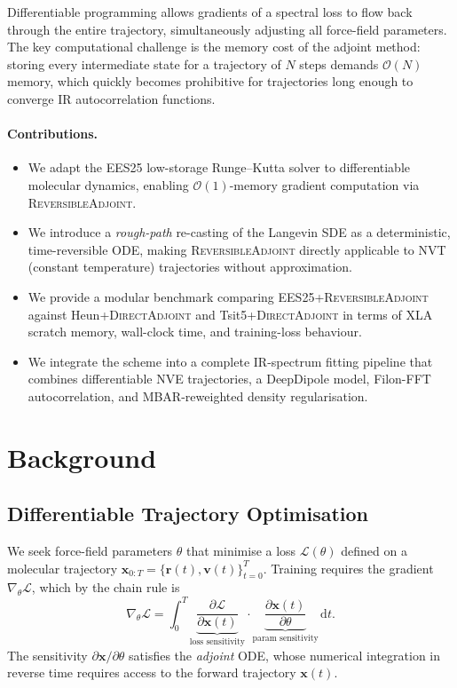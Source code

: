 \documentclass{article}
\newcommand{\dd}{\,\mathrm{d}}
\newcommand{\EES}{\textsc{EES25}}
\newcommand{\RevAdj}{\textsc{ReversibleAdjoint}}
\newcommand{\MBAR}{\textsc{MBAR}}
\begin{document}
Differentiable programming allows gradients of a spectral loss to flow back
through the entire trajectory, simultaneously adjusting all force-field
parameters.  The key computational challenge is the memory cost of the adjoint
method: storing every intermediate state for a trajectory of $N$ steps demands
$\mathcal{O}(N)$ memory, which quickly becomes prohibitive for trajectories
long enough to converge IR autocorrelation functions.

\paragraph{Contributions.}
\begin{itemize}
  \item We adapt the \EES{} low-storage Runge--Kutta solver to differentiable
    molecular dynamics, enabling $\mathcal{O}(1)$-memory gradient computation
    via \RevAdj{}.
  \item We introduce a \emph{rough-path} re-casting of the Langevin SDE as a
    deterministic, time-reversible ODE, making \RevAdj{} directly applicable
    to NVT (constant temperature) trajectories without approximation.
  \item We provide a modular benchmark comparing \EES{}+\RevAdj{} against
    Heun+\textsc{DirectAdjoint} and Tsit5+\textsc{DirectAdjoint} in terms of
    XLA scratch memory, wall-clock time, and training-loss behaviour.
  \item We integrate the scheme into a complete IR-spectrum fitting pipeline
    that combines differentiable NVE trajectories, a DeepDipole model,
    Filon-FFT autocorrelation, and \MBAR{}-reweighted density regularisation.
\end{itemize}

\section{Background}
\label{sec:background}

\subsection{Differentiable Trajectory Optimisation}

We seek force-field parameters $\theta$ that minimise a loss
$\mathcal{L}(\theta)$ defined on a molecular trajectory
$\bm{x}_{0:T} = \{\bm{r}(t), \bm{v}(t)\}_{t=0}^{T}$.
Training requires the gradient $\nabla_\theta \mathcal{L}$, which by the chain
rule is
\begin{equation}
  \nabla_\theta \mathcal{L}
  = \int_0^T
      \underbrace{\frac{\partial \mathcal{L}}{\partial \bm{x}(t)}}_{\text{loss sensitivity}}
      \cdot
      \underbrace{\frac{\partial \bm{x}(t)}{\partial \theta}}_{\text{param sensitivity}}
    \dd t.
\end{equation}
The sensitivity $\partial \bm{x}/\partial\theta$ satisfies the \emph{adjoint}
ODE, whose numerical integration in reverse time requires access to the forward
trajectory $\bm{x}(t)$.
\end{document}
